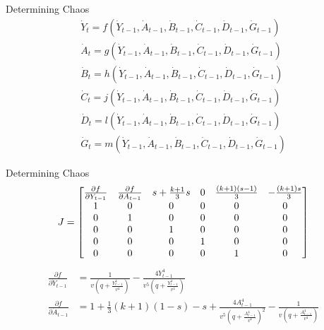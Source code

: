 \documentclass{beamer}
\begin{document}
\begin{frame}{Determining Chaos}
	\begin{align*}
		\dot Y_t = f(\dot Y_{t-1}, \dot A_{t-1}, \dot B_{t-1}, \dot C_{t-1}, \dot D_{t-1}, \dot G_{t-1})\\
		\dot A_t = g(\dot Y_{t-1}, \dot A_{t-1}, \dot B_{t-1}, \dot C_{t-1}, \dot D_{t-1}, \dot G_{t-1})\\
		\dot B_t = h(\dot Y_{t-1}, \dot A_{t-1}, \dot B_{t-1}, \dot C_{t-1}, \dot D_{t-1}, \dot G_{t-1})\\
		\dot C_t = j(\dot Y_{t-1}, \dot A_{t-1}, \dot B_{t-1}, \dot C_{t-1}, \dot D_{t-1}, \dot G_{t-1})\\
		\dot D_t = l(\dot Y_{t-1}, \dot A_{t-1}, \dot B_{t-1}, \dot C_{t-1}, \dot D_{t-1}, \dot G_{t-1})\\
		\dot G_t = m(\dot Y_{t-1}, \dot A_{t-1}, \dot B_{t-1}, \dot C_{t-1}, \dot D_{t-1}, \dot G_{t-1})
	\end{align*}
\end{frame}
\begin{frame}{Determining Chaos}
	\begin{equation*}
		J=
		\begin{bmatrix}\small
			\frac{\partial f}{\partial Y_{t-1}} & \frac{\partial f}{\partial A_{t-1}} & s+\frac{k+1}{3}s & 0 & \frac{(k+1)(s-1)}{3} & -\frac{(k+1)s}{3}\\
			1 & 0 & 0 & 0 & 0 & 0\\
			0 & 1 & 0 & 0 & 0 & 0\\
			0 & 0 & 1 & 0 & 0 & 0\\
			0 & 0 & 0 & 1 & 0 & 0\\
			0 & 0 & 0 & 0 & 1 & 0
		\end{bmatrix}
	\end{equation*}
	\begin{align*}
		\frac{\partial f}{\partial \dot Y_{t-1}}&= \frac{1}{v\left(q+\frac{Y_{t-1}^4}{v^4}\right)}-\frac{4Y_{t-1}^4}{v^5\left(q+\frac{Y_{t-1}^4}{v^4}\right)}\\
		\frac{\partial f}{\partial \dot A_{t-1}}&=1+\frac{1}{3}(k+1)(1-s)-s+\frac{4A_{t-1}^4}{v^5\left(q+\frac{A_{t-1}^4}{v^4}\right)^2}-\frac{1}{v\left(q+\frac{A_{t-1}^4}{v^4}\right)}
	\end{align*}
\end{frame}
\end{document}
